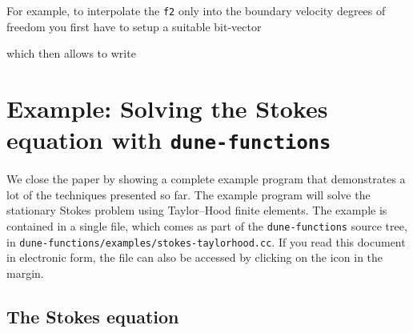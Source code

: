 \documentclass[a4paper,10pt,headings=normal,bibliography=totoc]{scrartcl}
\newcommand{\cpp}[1]{\lstinline[basicstyle=\ttfamily]!#1!}
\newcommand{\dunemodule}[1]{\texttt{#1}}
\newcommand{\file}[1]{\texttt{#1}}
\begin{document}
For example, to interpolate the \cpp{f2} only into the boundary velocity degrees of freedom
you first have to setup a suitable bit-vector
%

%
which then allows to write
%

%





\section{Example: Solving the Stokes equation with \dunemodule{dune-functions}}

We close the paper by showing a complete example program that demonstrates a lot
of the techniques presented so far.  The example program will solve the
stationary Stokes problem using Taylor--Hood finite elements.
The example is contained in a single file, which comes as part of the \dunemodule{dune-functions}
source tree, in \file{dune-functions/examples/stokes-taylorhood.cc}.  If you read this document in electronic form,
the file can also be accessed by clicking on the icon in the margin.%
%

\subsection{The Stokes equation}
\end{document}

